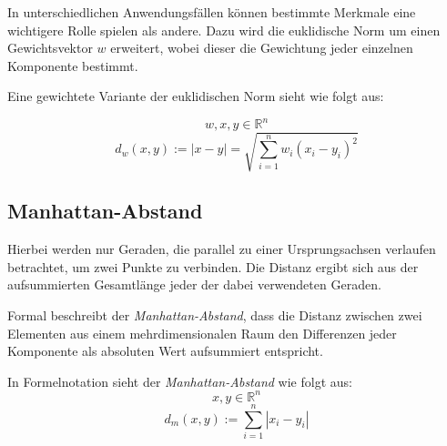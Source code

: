 \documentclass[fontsize=11pt]{scrartcl}
\begin{document}
                In unterschiedlichen Anwendungsfällen können bestimmte Merkmale eine wichtigere Rolle spielen als andere.\cite{ertel2016} Dazu wird die euklidische Norm um einen Gewichtsvektor $w$ erweitert, wobei dieser die Gewichtung jeder einzelnen Komponente bestimmt.\par Eine gewichtete Variante der euklidischen Norm sieht wie folgt aus:\par
                $$
                    w,x,y \in \mathbb{R}^n
                $$
                $$
                    d_w(x,y):= |x - y| = \sqrt{\sum_{i=1}^{n}w_i(x_i -y_i)^2}
                $$     

            
            \subsection{Manhattan-Abstand}
                Hierbei werden nur Geraden, die parallel zu einer Ursprungsachsen verlaufen betrachtet, um zwei Punkte zu verbinden. Die Distanz ergibt sich aus der aufsummierten Gesamtlänge jeder der dabei verwendeten Geraden.\par 
                Formal beschreibt der \emph{Manhattan-Abstand}, dass die Distanz zwischen zwei Elementen aus einem mehrdimensionalen Raum den Differenzen jeder Komponente als absoluten Wert aufsummiert entspricht.\par %

				
                In Formelnotation sieht der \emph{Manhattan-Abstand} wie folgt aus:
                $$
                    x,y \in \mathbb{R}^n 
                $$
                $$
                    d_m(x,y):= \sum_{i=1}^{n} |x_i -y_i|
                $$
\end{document}
